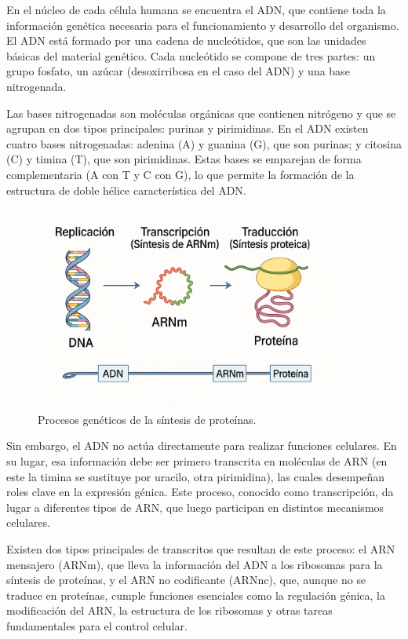 \documentclass[11pt,spanish,listoffigures,listoftables]{tfgetsinf}
\begin{document}
En el núcleo de cada célula humana se encuentra el \acs{ADN}, que contiene toda la información genética necesaria para el funcionamiento y desarrollo del organismo. El \acs{ADN} está formado por una cadena de nucleótidos, que son las unidades básicas del material genético. Cada nucleótido se compone de tres partes: un grupo fosfato, un azúcar (desoxirribosa en el caso del ADN) y una base nitrogenada.

Las bases nitrogenadas son moléculas orgánicas que contienen nitrógeno y que se agrupan en dos tipos principales: purinas y pirimidinas. En el \acs{ADN} existen cuatro bases nitrogenadas: adenina (A) y guanina (G), que son purinas; y citosina (C) y timina (T), que son pirimidinas. Estas bases se emparejan de forma complementaria (A con T y C con G), lo que permite la formación de la estructura de doble hélice característica del \acs{ADN}\cite{GEN}.


\begin{figure}[H]
   \centering
   \includegraphics[width=0.9\textwidth]{ADN.png}
   \caption{Procesos genéticos de la síntesis de proteínas.}
   \label{fig:etiqueta_opcional1}
\end{figure}

Sin embargo, el \acs{ADN} no actúa directamente para realizar funciones celulares. En su lugar, esa información debe ser primero transcrita en moléculas de \acs{ARN} (en este la timina se sustituye por uracilo, otra pirimidina), las cuales desempeñan roles clave en la expresión génica. Este proceso, conocido como transcripción, da lugar a diferentes tipos de \acs{ARN}, que luego participan en distintos mecanismos celulares.

Existen dos tipos principales de transcritos que resultan de este proceso: el \acs{ARN} mensajero (\acs{ARN}m), que lleva la información del \acs{ADN} a los ribosomas para la síntesis de proteínas, y el \acs{ARN} no codificante (ARNnc), que, aunque no se traduce en proteínas, cumple funciones esenciales como la regulación génica, la modificación del \acs{ARN}, la estructura de los ribosomas y otras tareas fundamentales para el control celular\cite[p.~254-300]{WAT}. 
\end{document}
